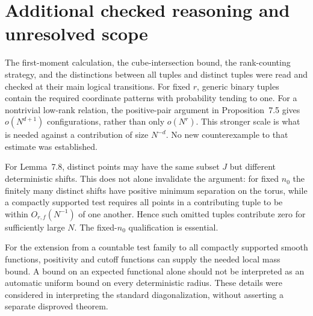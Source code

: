 \documentclass[10pt]{article}
\begin{document}
\section*{Additional checked reasoning and unresolved scope}
The first-moment calculation, the cube-intersection bound, the rank-counting strategy, and the distinctions between all tuples and distinct tuples were read and checked at their main logical transitions. For fixed \(r\), generic binary tuples contain the required coordinate patterns with probability tending to one. For a nontrivial low-rank relation, the positive-pair argument in Proposition 7.5 gives \(o(N^{d+1})\) configurations, rather than only \(o(N^r)\). This stronger scale is what is needed against a contribution of size \(N^{-d}\). No new counterexample to that estimate was established.\par
For Lemma 7.8, distinct points may have the same subset \(J\) but different deterministic shifts. This does not alone invalidate the argument: for fixed \(n_0\) the finitely many distinct shifts have positive minimum separation on the torus, while a compactly supported test requires all points in a contributing tuple to be within \(O_{r,f}(N^{-1})\) of one another. Hence such omitted tuples contribute zero for sufficiently large \(N\). The fixed-\(n_0\) qualification is essential.\par
For the extension from a countable test family to all compactly supported smooth functions, positivity and cutoff functions can supply the needed local mass bound. A bound on an expected functional alone should not be interpreted as an automatic uniform bound on every deterministic radius. These details were considered in interpreting the standard diagonalization, without asserting a separate disproved theorem.\par
\end{document}
